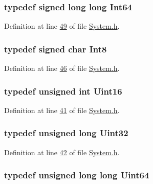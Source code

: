 \hypertarget{a00072_a56afe571a9be7582d493be2b31aed0ea}{
\subsubsection[{Int64}]{\setlength{\rightskip}{0pt plus 5cm}typedef signed long long {\bf Int64}}}\label{a00072_a56afe571a9be7582d493be2b31aed0ea}


Definition at line \hyperlink{a00072_source_l00049}{49} of file \hyperlink{a00072_source}{System.\+h}.

\hypertarget{a00072_a7e31ca7716b8d85dd473450a5c5e5a97}{
\subsubsection[{Int8}]{\setlength{\rightskip}{0pt plus 5cm}typedef signed char {\bf Int8}}}\label{a00072_a7e31ca7716b8d85dd473450a5c5e5a97}


Definition at line \hyperlink{a00072_source_l00046}{46} of file \hyperlink{a00072_source}{System.\+h}.

\hypertarget{a00072_a59a9f6be4562c327cbfb4f7e8e18f08b}{
\subsubsection[{Uint16}]{\setlength{\rightskip}{0pt plus 5cm}typedef unsigned int {\bf Uint16}}}\label{a00072_a59a9f6be4562c327cbfb4f7e8e18f08b}


Definition at line \hyperlink{a00072_source_l00041}{41} of file \hyperlink{a00072_source}{System.\+h}.

\hypertarget{a00072_aba99025e657f892beb7ff31cecf64653}{
\subsubsection[{Uint32}]{\setlength{\rightskip}{0pt plus 5cm}typedef unsigned long {\bf Uint32}}}\label{a00072_aba99025e657f892beb7ff31cecf64653}


Definition at line \hyperlink{a00072_source_l00042}{42} of file \hyperlink{a00072_source}{System.\+h}.

\hypertarget{a00072_a69e971e1bcd1d1beb4e09a8b17a95636}{
\subsubsection[{Uint64}]{\setlength{\rightskip}{0pt plus 5cm}typedef unsigned long long {\bf Uint64}}}\label{a00072_a69e971e1bcd1d1beb4e09a8b17a95636}


